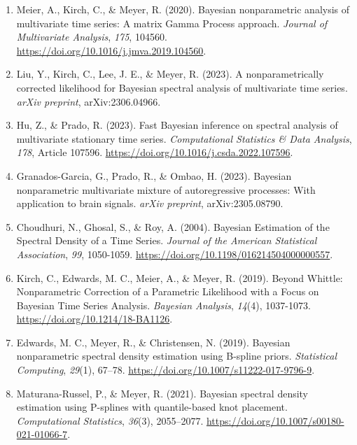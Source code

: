 \documentclass[12pt,a4paper]{article}
\begin{document}
\begin{enumerate}
\item \label{Meier 2018} Meier, A., Kirch, C., \& Meyer, R. (2020). Bayesian nonparametric analysis of multivariate time series: A matrix Gamma Process approach. \emph{Journal of Multivariate Analysis}, \textit{175}, 104560. \url{https://doi.org/10.1016/j.jmva.2019.104560}.

\item \label{liu 2023} Liu, Y., Kirch, C., Lee, J. E., \& Meyer, R. (2023). A nonparametrically corrected likelihood for Bayesian spectral analysis of multivariate time series. \emph{arXiv preprint}, arXiv:2306.04966.

\item \label{hu2023} Hu, Z., \& Prado, R. (2023). Fast Bayesian inference on spectral analysis of multivariate stationary time series. \textit{Computational Statistics \& Data Analysis}, \emph{178}, Article 107596. \url{https://doi.org/10.1016/j.csda.2022.107596}.

\item \label{gg2023} Granados-Garcia, G., Prado, R., \& Ombao, H. (2023). Bayesian nonparametric multivariate mixture of autoregressive processes: With application to brain signals. \emph{arXiv preprint}, arXiv:2305.08790.

\item \label{2004a} Choudhuri, N., Ghosal, S., \& Roy, A. (2004). Bayesian Estimation of the Spectral Density of a Time Series. \emph{Journal of the American Statistical Association}, \textit{99}, 1050-1059. \url{https://doi.org/10.1198/016214504000000557}.

\item \label{kirch2019} Kirch, C., Edwards, M. C., Meier, A., \& Meyer, R. (2019). Beyond Whittle: Nonparametric Correction of a Parametric Likelihood with a Focus on Bayesian Time Series Analysis. \emph{Bayesian Analysis}, \textit{14}(4), 1037-1073. \url{https://doi.org/10.1214/18-BA1126}.

\item \label{edwards2019} Edwards, M. C., Meyer, R., \& Christensen, N. (2019). Bayesian nonparametric spectral density estimation using B-spline priors. \emph{Statistical Computing}, \textit{29}(1), 67–78. \url{https://doi.org/10.1007/s11222-017-9796-9}.

\item \label{russel2021} Maturana-Russel, P., \& Meyer, R. (2021). Bayesian spectral density estimation using P-splines with quantile-based knot placement. \emph{Computational Statistics}, \textit{36}(3), 2055–2077. \url{https://doi.org/10.1007/s00180-021-01066-7}.


\end{enumerate}
\end{document}
